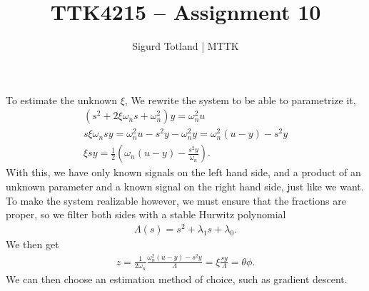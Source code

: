 \documentclass[]{article}
\title{TTK4215 – Assignment 10}
\author{Sigurd Totland | MTTK}
\begin{document}
\maketitle

\section{}
\subsection{}
To estimate the unknown $\xi$, We rewrite the system to be able to parametrize it,
\begin{equation}\begin{aligned}
(s^2 + 2\xi \omega_n s + \omega^2_n)y = \omega^2_n u \\
s \xi \omega_n sy =\omega^2_n u - s^2y - \omega^2_ny = \omega^2_n (u-y) - s^2y\\
\xi sy = \frac{1}{2}(\omega_n (u-y) - \frac{s^2y}{\omega_n}).
\end{aligned}\end{equation}
With this, we have only known signals on the left hand side, and a product of an unknown parameter and a known signal on the right hand side, just like we want. To make the system realizable however, we must ensure that the fractions are proper, so we filter both sides with a stable Hurwitz polynomial
\begin{equation}\begin{aligned}
\Lambda(s) = s^2 + \lambda_1 s + \lambda_0.
\end{aligned}\end{equation}
We then get
\begin{equation}\begin{aligned}
z = \frac{1}{2 \omega_n} \frac{\omega^2_n (u-y) - s^2y}{\Lambda} = \xi \frac{sy}{\Lambda} = \theta \phi.
\end{aligned}\end{equation}
We can then choose an estimation method of choice, such as gradient descent.
\end{document}
